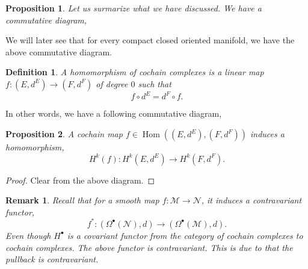 \documentclass[8pt]{article}
\newtheorem{proposition}{Proposition}[section]
\newtheorem{definition}{Definition}[section]
\newtheorem{remark}{Remark}[section]
\DeclareMathOperator{\Hom}{Hom}
\newcommand{\R}[0]{\mathbb{R}}
\newcommand{\Z}[0]{\mathbb{Z}}
\newcommand{\M}[0]{\mathcal{M}}
\newcommand{\maniN}[0]{\mathcal{N}}
\begin{document}
\begin{proposition}
  Let us surmarize what we have discussed. We have a commutative diagram,
  \begin{center}
  \end{center}
\end{proposition}

We will later see that for every compact closed oriented manifold, we have the above commutative diagram.

\begin{definition}
  A homomorphism of cochain complexes is a linear map $f:(E,d^E)\to (F,d^F)$ of degree $0$ such that 
  \begin{equation*}
    f\circ d^E=d^F\circ f.
  \end{equation*}
\end{definition}

In other words, we have a following commutative diagram,

\begin{center}
\end{center}

\begin{proposition}
  A cochain map $f\in\Hom((E,d^E),(F,d^F))$ induces a homomorphism,
  \begin{equation*}
    H^k(f):H^k(E,d^E)\to H^k(F,d^F).
  \end{equation*}
\end{proposition}

\begin{proof}
  Clear from the above diagram.
\end{proof}

\begin{remark}
  Recall that for a smooth map $f:\M\to\maniN$, it induces a contravariant functor,
  \begin{equation*}
    f^*:(\Omega^\bullet(\maniN),d)\to(\Omega^\bullet(\M),d).
  \end{equation*}
  Even though $H^\bullet$ is a covariant functor from the category of cochain complexes to cochain complexes. The above functor is contravariant. This is due to that the pullback is contravariant.
\end{remark}
\end{document}
